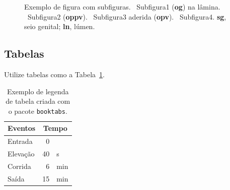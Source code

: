 \begin{figure}[htbp]
  \caption[Figura com subfiguras]{Exemplo de figura com subfiguras. ~Subfigura1 (\textbf{og}) na lâmina. ~Subfigura2 (\textbf{oppv}). ~Subfigura3 aderida (\textbf{opv}). ~Subfigura4. \textbf{sg}, seio genital; \textbf{ln}, lúmen.}%
  \label{fig:fsm}
\end{figure}

\subsection{Tabelas}\label{cap2:res:tabs}

Utilize tabelas como a Tabela~\ref{tab:exemplo}.

\begin{table}[htbp]
  \caption[Tabela com \texttt{booktabs}]{Exemplo de legenda de tabela criada com o pacote \texttt{booktabs}.}
  \label{tab:exemplo}
  \vspace{1em}
  \centering
  \begin{tabular}{l r@{\,} l}
    \toprule
    Eventos     &   \multicolumn{2}{c}{Tempo}\\
    \midrule
    Entrada     &   0   &       \\
    Elevação    &   40  &   s   \\
    Corrida     &   6   &   min \\
    Saída	&   15  &   min \\
    \bottomrule
  \end{tabular}
\end{table}

